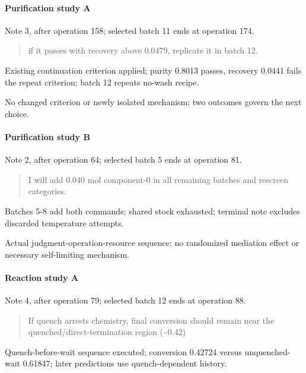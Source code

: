 \documentclass[10pt,a4paper]{article}
\begin{document}
\paragraph{Purification study A}\label{purification-study-a}

Note 3, after operation 158; selected batch 11 ends at operation 174.

\begin{quote}
if it passes with recovery above 0.0479, replicate it in batch 12.
\end{quote}

Existing continuation criterion applied; purity 0.8013 passes, recovery 0.0441 fails the repeat criterion; batch 12 repeats no-wash recipe.

No changed criterion or newly isolated mechanism; two outcomes govern the next choice.

\paragraph{Purification study B}\label{purification-study-b}

Note 2, after operation 64; selected batch 5 ends at operation 81.

\begin{quote}
I will add 0.040 mol component-0 in all remaining batches and rescreen categories.
\end{quote}

Batches 5-8 add both commands; shared stock exhausted; terminal note excludes discarded temperature attempts.

Actual judgment-operation-resource sequence; no randomized mediation effect or necessary self-limiting mechanism.

\paragraph{Reaction study A}\label{reaction-study-a}

Note 4, after operation 79; selected batch 12 ends at operation 88.

\begin{quote}
If quench arrests chemistry, final conversion should remain near the quenched/direct-termination region (\textasciitilde0.42)
\end{quote}

Quench-before-wait sequence executed; conversion 0.42724 versus unquenched-wait 0.61847; later predictions use quench-dependent history.
\end{document}
